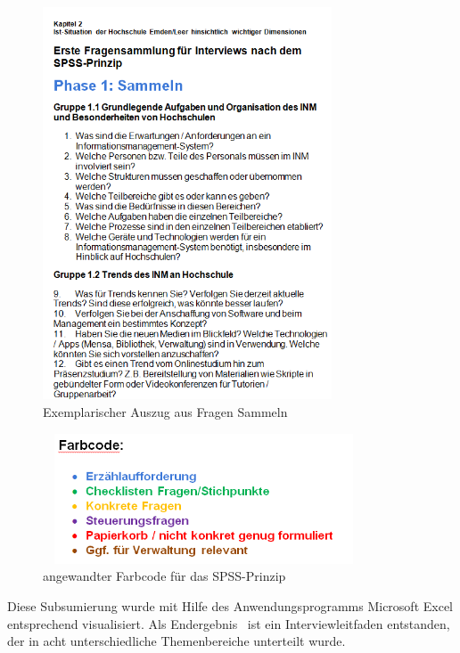 \documentclass[a4paper]{article}
\begin{document}
\begin{figure}
\centering
\includegraphics[width=8.585cm,height=11.652cm]{EntwurfKapitel2Gruppe220150528VW-img/EntwurfKapitel2Gruppe220150528VW-img001.png}
\caption[Exemplarischer Auszug aus Fragen Sammeln]{Exemplarischer Auszug aus Fragen Sammeln}

\end{figure}


\begin{figure}
\centering
\includegraphics[width=9.546cm,height=3.868cm]{EntwurfKapitel2Gruppe220150528VW-img/EntwurfKapitel2Gruppe220150528VW-img002.png}
\caption[angewandter Farbcode für das SPSS{}-Prinzip]{angewandter Farbcode für das SPSS-Prinzip}

\end{figure}
{\sffamily\mdseries\color{black}
Diese Subsumierung wurde mit Hilfe des Anwendungsprogramms Microsoft Excel entsprechend visualisiert. Als Endergebnis
\ ist ein Interviewleitfaden entstanden, der in acht unterschiedliche Themenbereiche unterteilt wurde.}
\end{document}
